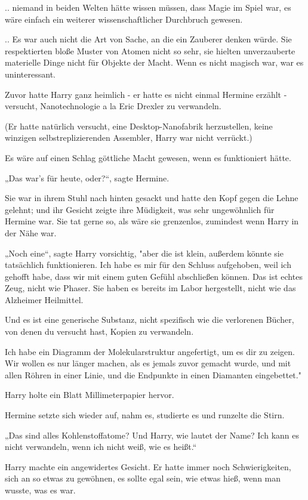{.. niemand in beiden Welten hätte wissen müssen, dass Magie im Spiel war, es wäre einfach ein weiterer wissenschaftlicher Durchbruch gewesen.

.. Es war auch nicht die Art von Sache, an die ein Zauberer denken würde. Sie respektierten bloße Muster von Atomen nicht so sehr, sie hielten unverzauberte materielle Dinge nicht für Objekte der Macht. Wenn es nicht magisch war, war es uninteressant.

Zuvor hatte Harry ganz heimlich - er hatte es nicht einmal Hermine erzählt - versucht, Nanotechnologie a la Eric Drexler zu verwandeln.

(Er hatte natürlich versucht, eine Desktop-Nanofabrik herzustellen, keine winzigen selbstreplizierenden Assembler, Harry war nicht verrückt.)

Es wäre auf einen Schlag göttliche Macht gewesen, wenn es funktioniert hätte.

„Das war's für heute, oder?“, sagte Hermine.

Sie war in ihrem Stuhl nach hinten gesackt und hatte den Kopf gegen die Lehne gelehnt; und ihr Gesicht zeigte ihre Müdigkeit, was sehr ungewöhnlich für Hermine war. Sie tat gerne so, als wäre sie grenzenlos, zumindest wenn Harry in der Nähe war.

„Noch eine“, sagte Harry vorsichtig, "aber die ist klein, außerdem könnte sie tatsächlich funktionieren. Ich habe es mir für den Schluss aufgehoben, weil ich gehofft habe, dass wir mit einem guten Gefühl abschließen können. Das ist echtes Zeug, nicht wie Phaser. Sie haben es bereits im Labor hergestellt, nicht wie das Alzheimer Heilmittel.

Und es ist eine generische Substanz, nicht spezifisch wie die verlorenen Bücher, von denen du versucht hast, Kopien zu verwandeln.

Ich habe ein Diagramm der Molekularstruktur angefertigt, um es dir zu zeigen. Wir wollen es nur länger machen, als es jemals zuvor gemacht wurde, und mit allen Röhren in einer Linie, und die Endpunkte in einen Diamanten eingebettet."

Harry holte ein Blatt Millimeterpapier hervor.

Hermine setzte sich wieder auf, nahm es, studierte es und runzelte die Stirn.

„Das sind alles Kohlenstoffatome? Und Harry, wie lautet der Name? Ich kann es nicht verwandeln, wenn ich nicht weiß, wie es heißt.“

Harry machte ein angewidertes Gesicht. Er hatte immer noch Schwierigkeiten, sich an so etwas zu gewöhnen, es sollte egal sein, wie etwas hieß, wenn man wusste, was es war.

}
